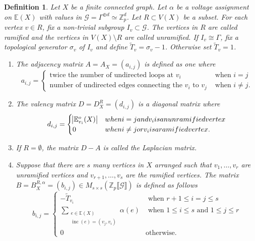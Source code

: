 \documentclass{amsart}
\newtheorem{definition}[theorem]{Definition}
\numberwithin{equation}{section}
\theoremstyle{remark}
\newcommand{\inc}{\operatorname{inc}}
\newcommand{\Z}{\mathbb{Z}}
\newcommand{\E}{\mathbb{E}}
\newcommand{\cG}{\mathcal{G}}
\theoremstyle{plain} %
\begin{document}
\begin{definition}
\label{matrix defn}
Let $X$ be a finite connected graph.
{Let $\alpha$ be a voltage assignment on $\E(X)$ with values in $\cG = {\Gamma^{\oplus d} \simeq} \Z_p^d$.
Let $R\subset V(X)$ be a subset.
For each vertex $v\in R$, fix a non-trivial subgroup $I_v\subset \mathcal{G}$.
The vertices in $R$ are called \emph{ramified} and the vertices in $V(X)\setminus R$ are called \emph{unramified}.
If $I_v\cong {\Gamma}$, fix a topological generator $\sigma_v$ of $I_v$ and define $\widetilde{T}_v=\sigma_v-1$.
Otherwise set $\widetilde{T}_v=1$. }

\begin{enumerate}
\item[\textup{(}i\textup{)}] The \emph{adjacency matrix} $A = {A_X} = \left(a_{i,j}\right)$ is defined as one where
\[
a_{i,j} = \begin{cases}
\textrm{twice the number of undirected loops at }v_i  & \textrm{ when }i=j\\
\textrm{number of undirected edges connecting the $v_i$ to $v_j$} & \textrm{ when }i\neq j.
\end{cases}
\]
\item[\textup{(}ii\textup{)}] The \emph{valency matrix} $D= {D^R_X} = (d_{i,j})$ is a diagonal matrix where 
\[
d_{i,j} = \begin{cases}
\abs{\E_{v_i}^o(X)} & \textrm{ when }i=j \textrm{ and } v_i \textrm{ is an unramified vertex}\\
0 & \textrm{ when }i\neq j \textrm{ or } v_i \textrm{ is a ramified vertex}.
\end{cases}
\]
\item[\textup{(}iii\textup{)}]  {If $R=\emptyset$, }the matrix $D - A$ is called the \emph{Laplacian matrix}.
\item[\textup{(}iv\textup{)}]
Suppose that there are $s$ many vertices in $X$ arranged such that $v_1, \ldots, v_{r}$ are unramified vertices and $v_{r+1}, \ldots, v_s$ are the ramified vertices.
The matrix $B = B^{{R,\alpha}}_{{X}}= (b_{i,j})\in M_{s\times s}({\Z_p\llbracket \cG \rrbracket})$ is defined as follows
\[
b_{i,j} = \begin{cases}
    - \widetilde{T}_{v_i} &\textrm{ when } r+1 \le i = j \le s\\
     \displaystyle\sum_{\substack{e\in \E(X) \\ \inc(e)=(v_j, v_i)}}{\alpha(e)} & \textrm{ when } 1\le i \le s \textrm{ and } 1\le j \le r\\
     0 & \textrm{otherwise}.
\end{cases}
\]
\end{enumerate} 
\end{definition}
\end{document}
